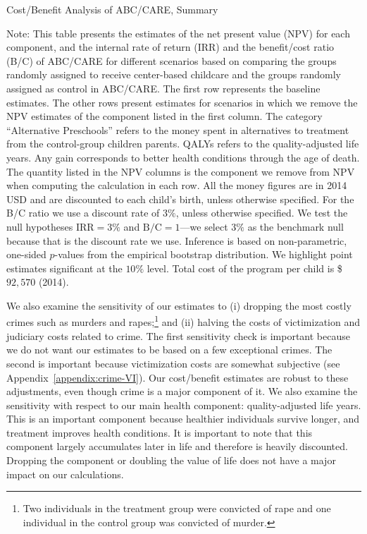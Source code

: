 \begin{table}[H]
\centering
\caption{Cost/Benefit Analysis of ABC/CARE, Summary}\label{table:cba}
\begin{threeparttable}
\tiny

\begin{tablenotes}
\footnotesize
\item Note: This table presents the estimates of the net present value (NPV) for each component, and the internal rate of return (IRR) and the benefit/cost ratio (B/C) of ABC/CARE for different scenarios based on comparing the groups randomly assigned to receive center-based childcare and the groups randomly assigned as control in ABC/CARE. The first row represents the baseline estimates. The other rows present estimates for scenarios in which we remove the NPV estimates of the component listed in the first column. The category ``Alternative Preschools'' refers to the money spent in alternatives to treatment from the control-group children parents. QALYs refers to the quality-adjusted life years. Any gain corresponds to better health conditions through the age of death. The quantity listed in the NPV columns is the component we remove from NPV when computing the calculation in each row. All the money figures are in 2014 USD and are discounted to each child's birth, unless otherwise specified. For the B/C ratio we use a discount rate of $3\%$, unless otherwise specified. We test the null hypotheses $\text{IRR} = 3\%$ and $\text{B/C} = 1$---we select $3\%$ as the benchmark null because that is the discount rate we use. Inference is based on non-parametric, one-sided $p$-values from the empirical bootstrap distribution. We highlight point estimates significant at the $10\%$ level. Total cost of the program per child is \$$92,570$ (2014).
\end{tablenotes}
\end{threeparttable}
\end{table}

We also examine the sensitivity of our estimates to (i) dropping the most costly crimes such as murders and rapes;\footnote{Two individuals in the treatment group were convicted of rape and one individual in the control group was convicted of murder.} and (ii) halving the costs of victimization and judiciary costs related to crime. The first sensitivity check is important because we do not want our estimates to be based on a few exceptional crimes. The second is important because victimization costs are somewhat subjective (see  Appendix~\ref{appendix:crime-VI}). Our cost/benefit estimates are robust to these adjustments, even though crime is a major component of it. We also examine the sensitivity with respect to our main health component: quality-adjusted life years. This is an important component because healthier individuals survive longer, and treatment improves health conditions. It is important to note that this component largely accumulates later in life and therefore is heavily discounted. Dropping the component or doubling the value of life does not have a major impact on our calculations.


